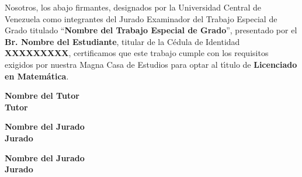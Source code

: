 

Nosotros, los abajo firmantes, designados por la Universidad Central de Venezuela como
integrantes del Jurado Examinador del Trabajo Especial de Grado titulado ``\textbf{Nombre del
Trabajo Especial de Grado}'', presentado por el \textbf{Br. Nombre del Estudiante}, titular de
la C\'edula de Identidad \textbf{XXXXXXXXX}, certificamos que este trabajo cumple con los
requisitos exigidos por nuestra Magna Casa de Estudios para optar al t\'{\i}tulo de
\textbf{Licenciado en Matem\'atica}.



\vspace{2cm}

\begin{center}
\underline{\hspace{8cm}}

\vspace{1cm}

\textbf{ Nombre del Tutor \\Tutor}

\vspace{3cm}

\underline{\hspace{8cm}}

\vspace{1cm}

\textbf{ Nombre del Jurado \\Jurado}

\vspace{3cm}

\underline{\hspace{8cm}}

\vspace{1cm}

\textbf{ Nombre del Jurado \\Jurado}

\end{center}

\newpage
